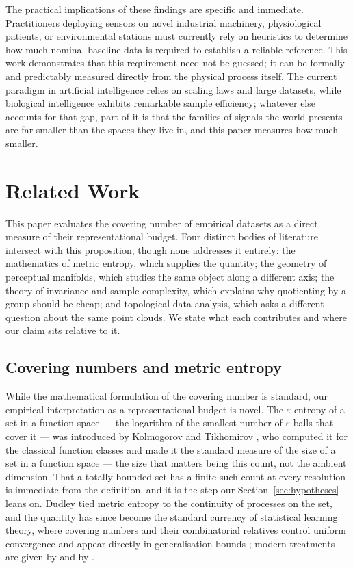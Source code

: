 \documentclass[10pt]{article}
\theoremstyle{plain}
\theoremstyle{definition}
\theoremstyle{remark}
\begin{document}
The practical implications of these findings are specific and immediate. Practitioners
deploying sensors on novel industrial machinery, physiological patients, or
environmental stations must currently rely on heuristics to determine how much
nominal baseline data is required to establish a reliable reference. This work
demonstrates that this requirement need not be guessed; it can be formally and
predictably measured directly from the physical process itself. The current
paradigm in artificial intelligence relies on scaling laws and large datasets,
while biological intelligence exhibits remarkable sample efficiency; whatever
else accounts for that gap, part of it is that the families of signals the world
presents are far smaller than the spaces they live in, and this paper measures
how much smaller.

\section{Related Work}
\label{sec:related}

This paper evaluates the covering number of empirical datasets as a direct
measure of their representational budget. Four distinct bodies of literature
intersect with this proposition, though none addresses it entirely:
the mathematics of metric entropy, which supplies the quantity; the geometry of
perceptual manifolds, which studies the same object along a different axis;
the theory of invariance and sample complexity, which explains why quotienting
by a group should be cheap; and topological data analysis, which asks a
different question about the same point clouds. We state what each contributes
and where our claim sits relative to it.

\subsection{Covering numbers and metric entropy}
\label{sec:rw-covering}

While the mathematical formulation of the covering number is standard, our
empirical interpretation as a representational budget is novel. The
$\varepsilon$-entropy of a set in a function space --- the logarithm of the
smallest number of $\varepsilon$-balls that cover it --- was introduced by
Kolmogorov and Tikhomirov \citep{kolmogorov1993entropy}, who computed it for
the classical function classes and made it the standard measure of the size of
a set in a function space --- the size that matters being this count, not the
ambient dimension. That a totally bounded set has a finite such count at every
resolution is immediate from the definition, and it is the step our
Section~\ref{sec:hypotheses} leans on. Dudley
\citep{dudley1967sizes} tied metric entropy to the continuity of processes on
the set, and the quantity has since become the standard currency of statistical
learning theory, where covering numbers and their combinatorial relatives
control uniform convergence \citep{vapnik1971uniform} and appear directly in
generalisation bounds \citep{cucker2001mathematical, zhou2002covering}; modern
treatments are given by \citet{vershynin2018high} and by
\citet{shalevshwartz2014understanding}.
\end{document}
